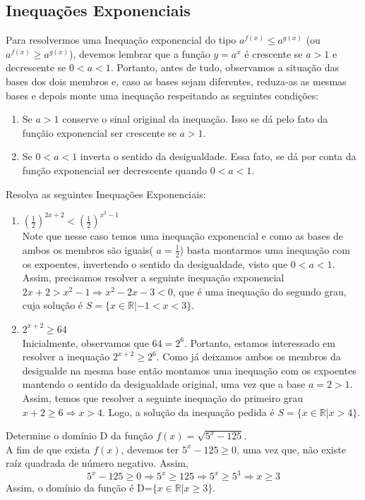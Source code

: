     \subsection{Inequações Exponenciais}
    Para resolvermos uma Inequação exponencial do tipo $a^{f(x)} \leq a^{g(x)}$ (ou $a^{f(x)} \geq a^{g(x)}$), devemos lembrar que a função $y=a^x$ é crescente se $a>1$ e decrescente se $0 < a< 1$. Portanto, antes de tudo, observamos a situação das bases dos dois membros e, caso as bases sejam diferentes, reduza-as as mesmas bases e depois monte uma inequação respeitando as seguintes condições:
    \begin{enumerate}
        \item Se $a>1$ conserve o sinal original da inequação. Isso se dá pelo fato da funçãio exponencial ser crescente se $a>1$.
        \item Se $0< a< 1$ inverta o sentido da desigualdade. Essa fato, se dá por conta da função exponencial ser decrescente quando $0< a< 1$.
    \end{enumerate}
    \begin{exe} Resolva as seguintes Inequações Exponenciais: \\
    \begin{enumerate}
    \item $\left( \frac{1}{2} \right)^{2x+2}< \left( \frac{1}{2} \right)^{x^2-1} $ \\
    \color{red}
    Note que nesse caso temos uma inequação exponencial e como as bases de ambos os membros são iguais( $a=\frac{1}{2}$) basta montarmos uma inequação com os expoentes, invertendo o sentido da desigualdade, visto que $0 < a < 1$. Assim, precisamos resolver a seguinte inequação exponencial $2x+2> x^2-1 \Longrightarrow x^2-2x-3< 0$, que é uma inequação do segundo grau, cuja solução é $S= \{ x \in \mathbb{R} | -1<x<3\}$.
    \color{black}
    \item $2^{x+2} \geq 64$ \\
    \color{red}
    Inicialmente, observamos que $64=2^6$. Portanto, estamos interessado em resolver a inequação $2^{x+2} \geq 2^6$. Como já deixamos ambos os membros da desigualde na mesma base então montamos uma inequação com os expoentes mantendo o sentido da desigualdade original, uma vez que a base $a=2>1$.  \\
    Assim, temos que resolver a seguinte inequação do primeiro grau $x+2 \geq 6 \Longrightarrow x> 4$. Logo, a solução da inequação pedida é $S= \{ x \in \mathbb{R}| x>4 \}$.
    \color{black}
\end{enumerate}
\end{exe}
\begin{exe} Determine o domínio D da função $f(x)= \sqrt{5^x-125}$.  \\
\color{red} A fim de que exista $f(x)$, devemos ter $5^x-125 \geq 0$, uma vez que, não existe raíz quadrada de número negativo. Assim,
$$5^x-125 \geq 0 \Longrightarrow 5^x \geq 125 \Longrightarrow 5^x \geq 5^3 \Longrightarrow x \geq 3$$
Assim, o domínio da função é D=$\{ x \in \mathbb{R}| x \geq 3 \}.$
\color{black}
\end{exe}

